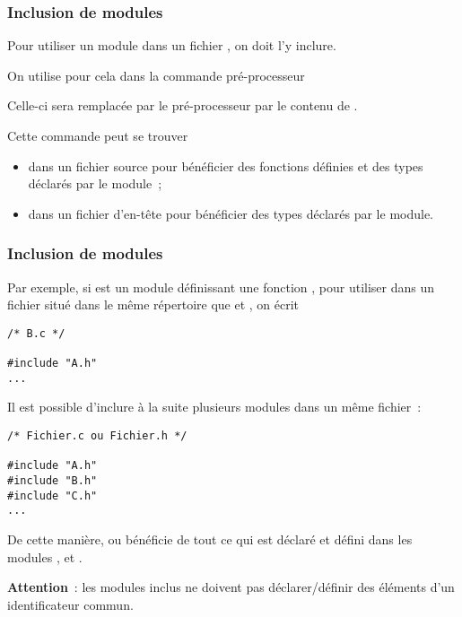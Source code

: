 \begin{frame}[fragile]
\frametitle{Inclusion de modules}
Pour utiliser un module  dans un fichier , on doit
l'y \alert{inclure}.
\bigskip

On utilise pour cela dans  la commande pré-processeur
\begin{center}
\end{center}
\bigskip

Celle-ci sera remplacée par le pré-processeur par le contenu de
.
\bigskip

Cette commande peut se trouver
\smallskip

\begin{itemize}
    \item dans un fichier source pour bénéficier des fonctions définies et
    des types déclarés par le module~;
    \medskip

    \item dans un fichier d'en-tête pour bénéficier des types déclarés
    par le module.
\end{itemize}
\end{frame}

\begin{frame}[fragile]
\frametitle{Inclusion de modules}
Par exemple, si  est un module définissant une fonction
, pour utiliser  dans un fichier 
 situé dans le même répertoire que  et ,
on écrit
\medskip

\begin{minipage}[c]{.3\textwidth}
\begin{lstlisting}[frame=single,numbers=none]
/* B.c */

#include "A.h"
...
\end{lstlisting}
\end{minipage}
\medskip

Il est possible d'inclure à la suite plusieurs modules dans un même fichier~:
\medskip

\begin{minipage}[c]{.4\textwidth}
\begin{lstlisting}[frame=single,numbers=none]
/* Fichier.c ou Fichier.h */

#include "A.h"
#include "B.h"
#include "C.h"
...
\end{lstlisting}
\end{minipage}
\qquad
\begin{minipage}[c]{.5\textwidth}
De cette manière,  ou  bénéficie de tout
ce qui est déclaré et défini dans les modules ,  et
.
\medskip

{\bf Attention}~: les modules inclus ne doivent pas déclarer/définir des
éléments d'un identificateur commun.
\end{minipage}
\end{frame}

